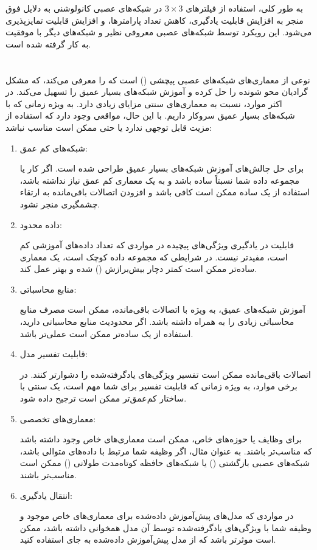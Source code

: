 \documentclass{article}
\begin{document}
به طور کلی، استفاده از فیلترهای $3\times3$ در شبکه‌های عصبی کانولوشنی به دلایل فوق منجر به افزایش قابلیت یادگیری، کاهش تعداد پارامترها، و افزایش قابلیت تمایز‌پذیری می‌شود. این رویکرد توسط شبکه‌های عصبی معروفی نظیر  و شبکه‌های دیگر با موفقیت به کار گرفته شده است.


\section{}


 نوعی از معماری‌های شبکه‌های عصبی پیچشی () است که  را معرفی می‌کند، که مشکل گرادیان محو شونده را حل کرده و آموزش شبکه‌های بسیار عمیق را تسهیل می‌کند. در اکثر موارد،  نسبت به معماری‌های سنتی  مزایای زیادی دارد. به ویژه زمانی که با شبکه‌های بسیار عمیق سروکار داریم. با این حال، مواقعی وجود دارد که استفاده از  مزیت قابل توجهی ندارد یا حتی ممکن است مناسب نباشد:

\begin{enumerate}

\item شبکه‌های کم عمق:

 برای حل چالش‌های آموزش شبکه‌های بسیار عمیق طراحی شده است. اگر کار یا مجموعه داده شما نسبتاً ساده باشد و به یک معماری کم عمق نیاز نداشته باشد، استفاده از یک  ساده ممکن است کافی باشد و افزودن اتصالات باقی‌مانده به ارتقاء چشمگیری منجر نشود.

\item داده محدود:

قابلیت  در یادگیری ویژگی‌های پیچیده در مواردی که تعداد داده‌های آموزشی کم است، مفیدتر نیست. در شرایطی که مجموعه داده کوچک است، یک معماری ساده‌تر ممکن است کمتر دچار بیش‌برازش () شده و بهتر عمل کند.

\item منابع محاسباتی:

آموزش شبکه‌های عمیق، به ویژه با اتصالات باقی‌مانده، ممکن است مصرف منابع محاسباتی زیادی را به همراه داشته باشد. اگر محدودیت منابع محاسباتی دارید، استفاده از یک  ساده‌تر ممکن است عملی‌تر باشد.

\item قابلیت تفسیر مدل:

اتصالات باقی‌مانده ممکن است تفسیر ویژگی‌های یادگرفته‌شده را دشوارتر کنند. در برخی موارد، به ویژه زمانی که قابلیت تفسیر برای شما مهم است، یک  سنتی با ساختار کم‌عمق‌تر ممکن است ترجیح داده شود.

\item معماری‌های تخصصی:

برای وظایف یا حوزه‌های خاص، ممکن است معماری‌های خاص  وجود داشته باشد که مناسب‌تر باشند. به عنوان مثال، اگر وظیفه شما مرتبط با داده‌های متوالی باشد، شبکه‌های عصبی بازگشتی () یا شبکه‌های حافظه کوتاه‌مدت طولانی () ممکن است مناسب‌تر باشند.

\item انتقال یادگیری:

در مواردی که مدل‌های پیش‌آموزش داده‌شده برای معماری‌های خاص  موجود و وظیفه شما با ویژگی‌های یادگرفته‌شده توسط آن مدل همخوانی داشته باشد، ممکن است موثرتر باشد که از مدل پیش‌آموزش داده‌شده به جای  استفاده کنید.
\end{enumerate}
\end{document}
